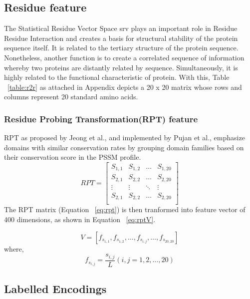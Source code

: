   
  \subsection{Residue feature} 
  The Statistical Residue Vector Space \acrshort{srv} \cite{Wong2018} plays an important role in Residue Residue Interaction and creates a basis for structural stability of the protein sequence itself. It is related to the tertiary structure of the protein sequence. Nonetheless, another function is to create a correlated sequence of information whereby two proteins are distantly related by sequence. Simultaneously, it is highly related to the functional characteristic of protein.  With this, Table ~\ref{table:r2r} as attached in Appendix depicts a 20 x 20 matrix whose rows and columns represent 20 standard amino acids.
  
  \subsubsection{Residue Probing Transformation(RPT) feature}
  RPT as proposed by Jeong et al.\cite{Jeong2011}, and implemented by Pujan et al.\cite{Mishra2019}, emphasize domains with similar conservation rates by grouping domain families based on their conservation score in the PSSM profile.
  \begin{equation}
    RPT = \begin{bmatrix}
      S_{1,1} & S_{1,2} & \dots & S_{1,20} \\
      S_{2,1} & S_{2,2} & \dots & S_{2,20} \\
      \vdots  & \vdots  & \ddots & \vdots \\
      S_{2,1} & S_{2,2} & \dots & S_{2,20} \\
    \end{bmatrix}
    \label{eq:rpt}
  \end{equation}
  The RPT matrix (Equation ~\ref{eq:rpt}) is then tranformed into feature vector of 400 dimensions, as shown in Equation ~\ref{eq:rptV}.
  
  \begin{equation}
    V = [ f_{s_{1,1}}, f_{s_{1,2}}, \dots, f_{s_{i,j}}, \dots, f_{s_{20,20}} ]
    \label{eq:rptV}
  \end{equation}
  where, 
  \begin{equation}
    f_{s_{i,j}} = \frac{s_{i,j}}{L} (i,j = 1,2,\dots,20)
    \label{eq:rptF}
  \end{equation}

  \subsection{Labelled Encodings}
  
